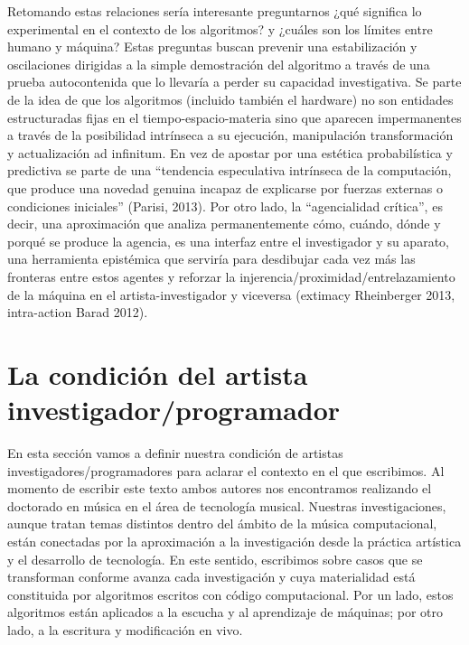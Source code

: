 Retomando estas relaciones sería interesante preguntarnos ¿qué significa lo experimental en el contexto de los algoritmos? y ¿cuáles son los límites entre humano y máquina? Estas preguntas buscan prevenir una estabilización y oscilaciones dirigidas a la simple demostración del algoritmo a través de una prueba autocontenida que lo llevaría a perder su capacidad investigativa. Se parte de la idea de que los algoritmos (incluido también el hardware) no son entidades estructuradas fijas en el tiempo-espacio-materia sino que aparecen impermanentes a través de la posibilidad intrínseca a su ejecución, manipulación transformación y actualización ad infinitum. En vez de apostar por una estética probabilística y predictiva se parte de una “tendencia especulativa intrínseca de la computación, que produce una novedad genuina incapaz de explicarse por fuerzas externas o condiciones iniciales” (Parisi, 2013). Por otro lado, la “agencialidad crítica”, es decir, una aproximación que analiza permanentemente cómo, cuándo, dónde y porqué se produce la agencia, es una interfaz entre el investigador y su aparato, una herramienta epistémica que serviría para desdibujar cada vez más las fronteras entre estos agentes y reforzar la injerencia/proximidad/entrelazamiento de la máquina en el artista-investigador y viceversa (extimacy Rheinberger 2013, intra-action Barad 2012).

\section{La condición del artista investigador/programador}
En esta sección vamos a definir nuestra condición de artistas investigadores/programadores para aclarar el contexto en el que escribimos. Al momento de escribir este texto ambos autores nos encontramos realizando el doctorado en música en el área de tecnología musical. Nuestras investigaciones, aunque tratan temas distintos dentro del ámbito de la música computacional, están conectadas por la aproximación a la investigación desde la práctica artística y el desarrollo de tecnología. En este sentido, escribimos sobre casos que se transforman conforme avanza cada investigación y cuya materialidad está constituida por algoritmos escritos con código computacional. Por un lado, estos algoritmos están aplicados a la escucha y al aprendizaje de máquinas; por otro lado, a la escritura y modificación en vivo.

